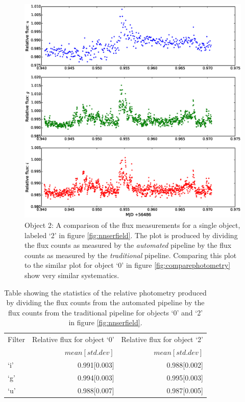 \begin{figure}
\centering
\includegraphics[width=140mm]{images/compare_photometry_2.eps}
\caption{Object 2: A comparison of the flux measurements for a single object, labeled `2' in figure \ref{fig:nnserfield}. The plot is produced by dividing the flux counts as measured by the \emph{automated} pipeline by the flux counts as measured by the \emph{traditional} pipeline. Comparing this plot to the similar plot for object `0' in figure \ref{fig:comparephotometry} show very similar systematics.}
\label{fig:comparephotometry2}
\end{figure}

\begin{table}
  \centering
  \caption{Table showing the statistics of the relative photometry produced by dividing the flux counts from the automated pipeline by the flux counts from the traditional pipeline for objects `0'  and `2' in figure \ref{fig:nnserfield}.}
  \begin{tabular}{l r r }
    \hline
    Filter & Relative flux  for object `0' & Relative flux  for object `2'\\
           &  $mean[std. dev]$ &  $mean[std. dev]$\\
    \hline
    `i'    & 0.991[0.003]  & 0.988[0.002] \\
    `g'    & 0.994[0.003] & 0.995[0.003]\\
    `u'    & 0.988[0.007] & 0.987[0.005]\\
    \hline
   \end{tabular}
  \label{tab:differential}
  
\end{table}

